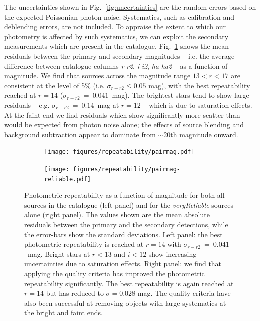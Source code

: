 \documentclass[useAMS,usenatbib]{mn2e}
\begin{document}
The uncertainties shown in Fig.~\ref{fig:uncertainties}
are the random errors based on the expected Poissonian photon noise.
Systematics, such as calibration and deblending errors,
are not included.
To appraise the extent to which our photometry is affected
by such systematics, we can exploit the
secondary measurements which are present in the catalogue.
Fig.~\ref{fig:pairmag} shows the mean residuals between
the primary and secondary magnitudes
-- i.e. the average difference between catalogue columns \emph{r}-\emph{r2},
\emph{i}-\emph{i2}, \emph{ha}-\emph{ha2} -- as a function of magnitude.
We find that sources across the magnitude range 
$13 < r < 17$ are consistent at the level of 5\%
(i.e. $\sigma_{r-r2} \le 0.05$ mag),
with the best repeatability
reached at $r=14$ ($\sigma_{r-r2}~=~0.041$~mag).
The brightest stars tend to show large residuals
-- e.g. $\sigma_{r-r2}~=~0.14$~mag at $r=12$ --
which is due to saturation effects.
At the faint end we find residuals which
show significantly more scatter than would be expected
from photon noise alone;
the effects of source blending and background subtraction
appear to dominate from $\sim$20th magnitude onward.

\begin{figure}
\captionsetup[subfigure]{labelformat=empty}
\begin{subfigure}[b]{0.45\linewidth}
\centering
\texttt{[image: figures/repeatability/pairmag.pdf]}
\caption{}
\label{fig:pairmag}
\end{subfigure}
\hspace{0.5cm}
\begin{subfigure}[b]{0.45\linewidth}
\centering
\texttt{[image: figures/repeatability/pairmag-reliable.pdf]}
\caption{}
\label{fig:pairmag_reliable}
\end{subfigure}
\caption{Photometric repeatability as a function of magnitude
         for both all sources in the catalogue (left panel)
         and for the \emph{veryReliable} sources alone (right panel).
         The values shown are the mean absolute residuals
         between the primary and the secondary detections,
         while the error-bars show the standard deviations.
         Left panel: 
         the best photometric repeatability is reached at $r=14$
         with $\sigma_{r-r2}~=~0.041$~mag.
         Bright stars at $r<13$ and $i<12$ 
         show increasing uncertainties due to saturation effects.
         Right panel: we find that applying the quality criteria
         has improved the photometric repeatability significantly.
         The best repeatability is again reached at $r=14$
         but has reduced to $\sigma=0.028$ mag.
         The quality criteria have also been successful
         at removing objects with large systematics at the bright
         and faint ends.
    }
\end{figure}
\end{document}
